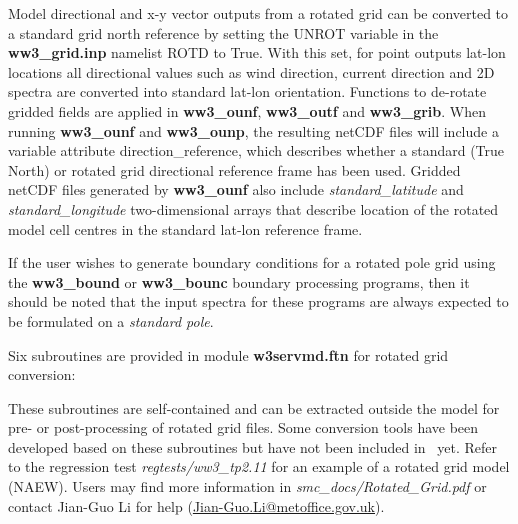 Model directional and x-y vector outputs from a rotated grid can be converted
to a standard grid north reference by setting the UNROT variable in the
{\bf ww3\_grid.inp} namelist ROTD to True. With this set, for point outputs
lat-lon locations all directional
values such as wind direction, current direction and 2D spectra are converted
into standard lat-lon orientation. Functions to de-rotate gridded
fields are applied in {\bf ww3\_ounf}, {\bf ww3\_outf} and {\bf ww3\_grib}. 
When running {\bf ww3\_ounf} and {\bf ww3\_ounp}, the resulting netCDF
files will include a variable attribute direction\_reference, which describes
whether a standard (True North) or rotated grid directional reference frame
has been used. Gridded netCDF files generated by {\bf ww3\_ounf} also include
\emph{standard\_latitude} and \emph{standard\_longitude} two-dimensional arrays
that describe location of the rotated model cell centres in the standard lat-lon
reference frame.

If the user wishes to generate boundary conditions for a rotated pole grid using
the {\bf ww3\_bound} or {\bf ww3\_bounc} boundary processing programs, then it
should be noted that the input spectra for these programs are always expected
to be formulated on a \emph{standard pole}.

Six subroutines are provided in module {\bf w3servmd.ftn} for rotated grid
conversion:
\begin{vlist}
\end{vlist}
These subroutines are self-contained and can be extracted outside the model
for pre- or post-processing of rotated grid files.  Some conversion tools have
been developed based on these subroutines but have not been included in \ws\
yet. Refer to the regression test \emph{regtests/ww3\_tp2.11} for an example
of a rotated grid model (NAEW).  Users may find more information in
\emph{smc\_docs/Rotated\_Grid.pdf} or contact Jian-Guo Li for help
(\url{Jian-Guo.Li@metoffice.gov.uk}).
